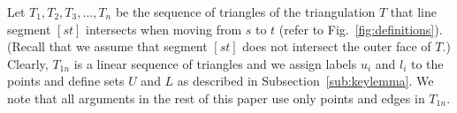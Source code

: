 Let $T_1, T_2, T_3, \dots, T_n$ be the sequence of
triangles of the %
triangulation $T$ that line segment $[st]$ intersects
when moving from $s$ to $t$ (refer to Fig.~\ref{fig:definitions}). (Recall
that we assume that segment $[st]$ does not intersect the outer face of
$T$.)
Clearly, $T_{1n}$ is a linear
sequence of triangles and we assign labels $u_i$ and $l_i$ to the points
and define sets $U$ and $L$ as described in Subsection~\ref{sub:keylemma}.
We note that all arguments in the rest of this paper use only points
and edges in $T_{1n}$. 









